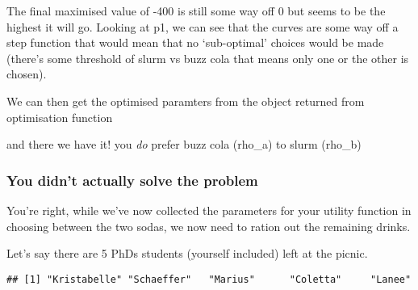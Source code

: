 \documentclass[]{article}
\newenvironment{Shaded}{\begin{snugshade}}{\end{snugshade}}
\newcommand{\KeywordTok}[1]{\textcolor[rgb]{0.13,0.29,0.53}{\textbf{#1}}}
\newcommand{\DecValTok}[1]{\textcolor[rgb]{0.00,0.00,0.81}{#1}}
\newcommand{\StringTok}[1]{\textcolor[rgb]{0.31,0.60,0.02}{#1}}
\newcommand{\CommentTok}[1]{\textcolor[rgb]{0.56,0.35,0.01}{\textit{#1}}}
\newcommand{\OperatorTok}[1]{\textcolor[rgb]{0.81,0.36,0.00}{\textbf{#1}}}
\newcommand{\NormalTok}[1]{#1}
\begin{document}
The final maximised value of -400 is still some way off 0 but seems to
be the highest it will go. Looking at p1, we can see that the curves are
some way off a step function that would mean that no `sub-optimal'
choices would be made (there's some threshold of slurm vs buzz cola that
means only one or the other is chosen).

We can then get the optimised paramters from the object returned from
optimisation function

\begin{Shaded}
\end{Shaded}

and there we have it! you \emph{do} prefer buzz cola (rho\_a) to slurm
(rho\_b)

\subsubsection{You didn't actually solve the
problem}\label{you-didnt-actually-solve-the-problem}

You're right, while we've now collected the parameters for your utility
function in choosing between the two sodas, we now need to ration out
the remaining drinks.

Let's say there are 5 PhDs students (yourself included) left at the
picnic.

\begin{Shaded}
\end{Shaded}

\begin{verbatim}
## [1] "Kristabelle" "Schaeffer"   "Marius"      "Coletta"     "Lanee"
\end{verbatim}
\end{document}

